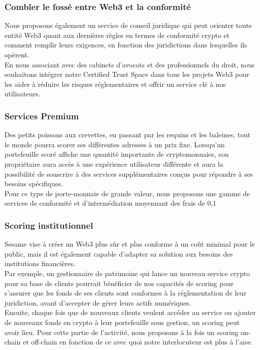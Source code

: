 ﻿\documentclass[a4paper]{article}
\let\OldTexttrademark\texttrademark
\renewcommand{\texttrademark}{\OldTexttrademark\xspace}%
\begin{document}
\subsubsection{Combler le fossé entre Web3 et la conformité}
Nous proposons également un service de conseil juridique qui peut orienter toute entité Web3 quant aux dernières règles en termes de conformité crypto et comment remplir leurs exigences, en fonction des juridictions dans lesquelles ils opèrent. \\

En nous associant avec des cabinets d'avocats et des professionnels du droit, nous souhaitons intégrer notre Certified Trust Space\texttrademark dans tous les projets Web3 pour les aider à réduire les risques réglementaires et offrir un service clé à nos utilisateurs.

\subsubsection{Services Premium}
Des petits poissons aux crevettes, en passant par les requins et les baleines, tout le monde pourra scorer ses différentes adresses à un prix fixe. Lorsqu'un portefeuille scoré affiche une quantité importante de cryptomonnaies, son propriétaire aura accès à une expérience utilisateur différente et aura la possibilité de souscrire à des services supplémentaires conçus pour répondre à ses besoins spécifiques. \\

Pour ce type de porte-monnaie de grande valeur, nous proposons une gamme de services de conformité et d'intermédiation moyennant des frais de 0,1 %
\subsubsection{Scoring institutionnel} 
Sesame vise à créer un Web3 plus sûr et plus conforme à un coût minimal pour le public, mais il est également capable d'adapter sa solution aux besoins des institutions financières. \\

Par exemple, un gestionnaire de patrimoine qui lance un nouveau service crypto pour sa base de clients pourrait bénéficier de nos capacités de scoring pour s'assurer que les fonds de ses clients sont conformes à la réglementation de leur juridiction, avant d'accepter de gérer leurs actifs numériques. \\

Ensuite, chaque fois que de nouveaux clients veulent accéder au service ou ajouter de nouveaux fonds en crypto à leur portefeuille sous gestion, un scoring peut avoir lieu. Pour cette partie de l'activité, nous proposons à la fois un scoring on-chain et off-chain en fonction de ce avec quoi notre interlocuteur est plus à l'aise.
\end{document}

